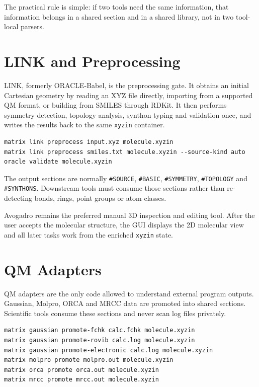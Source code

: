 \documentclass[11pt]{article}
\newcommand{\xyzin}{\texttt{xyzin}}
\newcommand{\sectionname}[1]{\texttt{\##1}}
\begin{document}
The practical rule is simple: if two tools need the same information, that
information belongs in a shared section and in a shared library, not in two
tool-local parsers.

\section{LINK and Preprocessing}

LINK, formerly ORACLE-Babel, is the preprocessing gate.  It obtains an initial Cartesian
geometry by reading an XYZ file directly, importing from a supported QM format,
or building from SMILES through RDKit.  It then performs symmetry detection,
topology analysis, synthon typing and validation once, and writes the results
back to the same \xyzin{} container.

\begin{lstlisting}[style=matrix]
matrix link preprocess input.xyz molecule.xyzin
matrix link preprocess smiles.txt molecule.xyzin --source-kind auto
oracle validate molecule.xyzin
\end{lstlisting}

The output sections are normally \sectionname{SOURCE}, \sectionname{BASIC},
\sectionname{SYMMETRY}, \sectionname{TOPOLOGY} and \sectionname{SYNTHONS}.
Downstream tools must consume those sections rather than re-detecting bonds,
rings, point groups or atom classes.

Avogadro remains the preferred manual 3D inspection and editing tool.  After
the user accepts the molecular structure, the GUI displays the 2D molecular
view and all later tasks work from the enriched \xyzin{} state.

\section{QM Adapters}

QM adapters are the only code allowed to understand external program outputs.
Gaussian, Molpro, ORCA and MRCC data are promoted into shared sections.
Scientific tools consume these sections and never scan log files privately.

\begin{lstlisting}[style=matrix]
matrix gaussian promote-fchk calc.fchk molecule.xyzin
matrix gaussian promote-rovib calc.log molecule.xyzin
matrix gaussian promote-electronic calc.log molecule.xyzin
matrix molpro promote molpro.out molecule.xyzin
matrix orca promote orca.out molecule.xyzin
matrix mrcc promote mrcc.out molecule.xyzin
\end{lstlisting}
\end{document}
